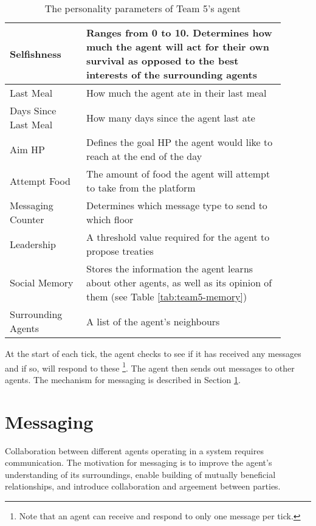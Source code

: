\begin{table}
    \centering
\begin{tabular}%
    {| >{\raggedleft\arraybackslash}p{0.25\linewidth} | %
    >{\raggedright\arraybackslash}p{0.65\linewidth} | %
    }
    \hline
    Selfishness          & Ranges from 0 to 10. Determines how much the agent will act for their own survival as opposed to the best interests of the surrounding agents\\
    \hline
    Last Meal            & How much the agent ate in their last meal\\
    \hline
    Days Since Last Meal & How many days since the agent last ate\\
    \hline
    Aim HP               & Defines the goal HP the agent would like to reach at the end of the day\\
    \hline
    Attempt Food         & The amount of food the agent will attempt to take from the platform\\
    \hline
    Messaging Counter    & Determines which message type to send to which floor \\
    Leadership           & A threshold value required for the agent to propose treaties\\
    \hline
    Social Memory        & Stores the information the agent learns about other agents, as well as its opinion of them (see Table \ref{tab:team5-memory})\\
    \hline
    Surrounding Agents   & A list of the agent's neighbours\\
    \hline
\end{tabular}
\caption{The personality parameters of Team 5's agent}
\label{tab:team5-personality}
\end{table}

At the start of each tick, the agent checks to see if it has received any messages and if so, will respond to these \footnote{Note that an agent can receive and respond to only one message per tick.}. The agent then sends out messages to other agents. The mechanism for messaging is described in Section \ref{sec:team5-messaging}.

\section{Messaging}\label{sec:team5-messaging}
Collaboration between different agents operating in a system requires communication. The motivation for messaging is to improve the agent's understanding of its surroundings, enable building of mutually beneficial relationships, and introduce collaboration and argeement between parties.

